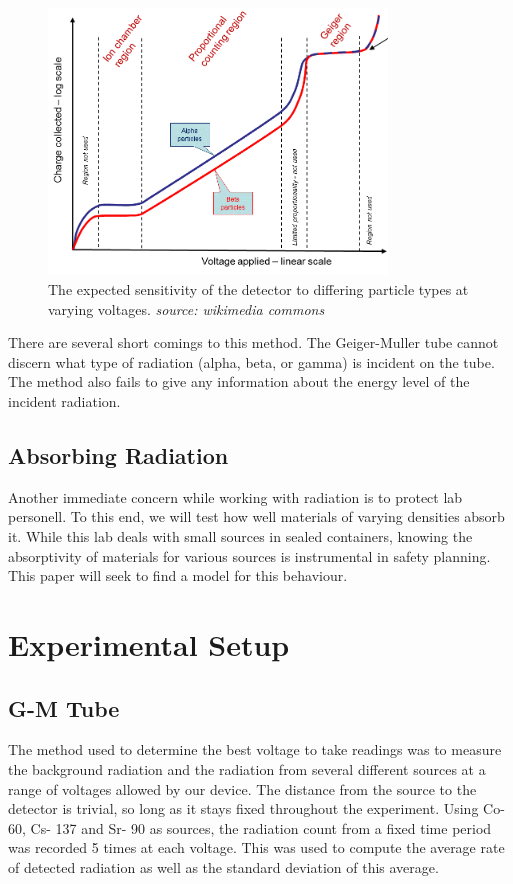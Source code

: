 \documentclass[aps,twocolumn,secnumarabic,balancelastpage,amsmath,amssymb,nofootinbib]{revtex4}
\begin{document}
\begin{figure}[b]
\includegraphics[width=9cm]{countRegion}
\caption{The expected sensitivity of the detector to differing particle types at varying voltages. \textit{source: wikimedia commons}}
\label{fig:countRegion}
\end{figure}

There are several short comings to this method. The Geiger-Muller tube cannot discern what type of radiation (alpha, beta, or gamma) is incident on the tube. The method also fails to give any information about the energy level of the incident radiation.

\subsection{Absorbing Radiation}
Another immediate concern while working with radiation is to protect lab personell. To this end, we will test how well materials of varying densities absorb it.  While this lab deals with small sources in sealed containers, knowing the absorptivity of materials for various sources is instrumental in safety planning. This paper will seek to find a model for this behaviour.

\section{Experimental Setup}
\subsection{G-M Tube}
The method used to determine the best voltage to take readings was to measure the background radiation and the radiation from several different sources at a range of voltages allowed by our device. The distance from the source to the detector is trivial, so long as it stays fixed throughout the experiment. Using Co-60, Cs- 137 and Sr- 90 as sources, the radiation count from a fixed time period was recorded 5 times at each voltage. This was used to compute the average rate of detected radiation as well as the standard deviation of this average.
\end{document}

